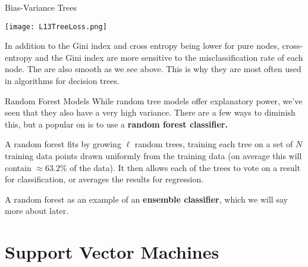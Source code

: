 \documentclass[10pt, table, dvipsnames,xcdraw]{beamer}
\begin{document}
\begin{frame}[fragile]{Bias-Variance Trees}
  \begin{minipage}[t][0.5\textheight][t]{\textwidth}
	\centering \texttt{[image: L13TreeLoss.png]} 
  \end{minipage}
  \vfill
\begin{minipage}[t][0.5\textheight][t]{\textwidth}
In addition to the Gini index and cross entropy being lower for pure nodes, cross-entropy and the Gini index are more sensitive to the misclassification rate of each node. The are also smooth as we see above. This is why they are most often used in algorithms for decision trees.
\end{minipage}
\end{frame}



\begin{frame}[fragile]{Random Forest Models}
While random tree models offer explanatory power, we've seen that they also have a very high variance. There are a few ways to diminish this, but a popular on is to use a \textbf{random forest classifier.} \pause \newline 

A random forest fits by growing $\ell$ random trees, training each tree on a set of $N$ training data points drawn uniformly from the training data (on average this will contain $\approx 63.2\%$ of the data). It then allows each of the trees to vote on a result for classification, or averages the results for regression. \pause\newline

A random forest as an example of an \textbf{ensemble classifier}, which we will say more about later. 
\end{frame}



\section{Support Vector Machines}
\end{document}
